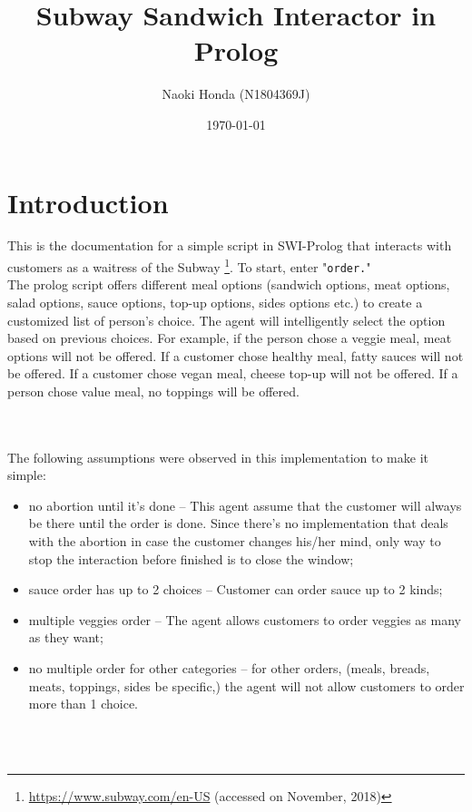 \documentclass[12pt,a4paper]{article}
\title{Subway Sandwich Interactor in Prolog}
\author{Naoki Honda (N1804369J)}
\date{\monthyeardate\today}
\newcommand{\varname}[1]{\texttt{#1}}
\newcommand{\predname}[1]{{\color{MidnightBlue}\varname{#1}}}
\begin{document}
\maketitle

\section{Introduction}

This is the documentation for a simple script in SWI-Prolog that interacts with customers as a waitress of the Subway \footnote{\url{https://www.subway.com/en-US} (accessed on November, 2018)}. To start, enter "\predname{order.}" \\
The prolog script offers different meal options (sandwich options, meat options, salad options, sauce options, top-up options, sides options etc.) to create a customized list of person’s choice. The agent will intelligently select the option based on previous choices. For example, if the person chose a veggie meal, meat options will not be offered. If a customer chose healthy meal, fatty sauces will not be offered. If a customer chose vegan meal, cheese top-up will not be offered. If a person chose value meal, no toppings will be offered.


\ \\ 
\ \\ 
The following assumptions were observed in this implementation to make it simple:
\begin{itemize}
    \item no abortion until it's done -- This agent assume that the customer will always be there until the order is done. Since there's no implementation that deals with the abortion in case the customer changes his/her mind, only way to stop the interaction before finished is to close the window;
    
    \item sauce order has up to 2 choices -- Customer can order sauce up to 2 kinds;
    
    \item multiple veggies order -- The agent allows customers to order veggies as many as they want;
    
    \item no multiple order for other categories -- for other orders, (meals, breads, meats, toppings, sides be specific,) the agent will not allow customers to order more than 1 choice.
\end{itemize}
\ \\ 
\ \\ 
\end{document}
